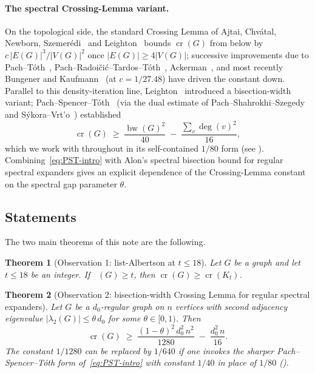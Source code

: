 \documentclass[11pt,a4paper]{article}
\newtheorem{theorem}{Theorem}
\theoremstyle{definition}
\DeclareMathOperator{\crN}{cr}
\DeclareMathOperator{\chl}{\chi_{\ell}}
\DeclareMathOperator{\bw}{bw}
\begin{document}
\paragraph{The spectral Crossing-Lemma variant.}
On the topological side, the standard Crossing Lemma of Ajtai,
Chv\'atal, Newborn, Szemer\'edi~\cite{ACNS} and
Leighton~\cite{Leighton83} bounds $\crN(G)$ from below by
$c\,|E(G)|^{3}/|V(G)|^{2}$ once $|E(G)| \ge 4|V(G)|$; successive
improvements due to Pach--T\'oth~\cite{PachToth97},
Pach--Radoi\v{c}i\'c--Tardos--T\'oth~\cite{PRTT},
Ackerman~\cite{Ackerman}, and most recently Bungener and
Kaufmann~\cite{BK24} (at $c = 1/27.48$) have driven the constant
down. Parallel to this density-iteration line, Leighton~\cite{Leighton84}
introduced a bisection-width variant; Pach--Spencer--T\'oth~\cite{PachSpencerToth}
(via the dual estimate of Pach--Shahrokhi--Szegedy~\cite{PachShahrokhiSzegedy}
and S\'ykora--Vrt'o~\cite{SykoraVrto}) established
\begin{equation}\label{eq:PST-intro}
   \crN(G) \;\ge\; \frac{\bw(G)^{2}}{40} \;-\; \frac{\sum_v \deg(v)^{2}}{16},
\end{equation}
which we work with throughout in its self-contained $1/80$ form
(see ). Combining~\eqref{eq:PST-intro} with Alon's
spectral bisection bound for regular spectral expanders gives an
explicit dependence of the Crossing-Lemma constant on the spectral
gap parameter $\theta$.

\subsection{Statements}\label{ssec:statements}

The two main theorems of this note are the following.

\begin{theorem}[Observation 1: list-Albertson at $t \le 18$]\label{thm:main-list}
Let $G$ be a graph and let $t \le 18$ be an integer. If
$\chl(G) \ge t$, then $\crN(G) \ge \crN(K_t)$.
\end{theorem}

\begin{theorem}[Observation 2: bisection-width Crossing Lemma for
                regular spectral expanders]\label{thm:main-spec}
Let $G$ be a $d_0$-regular graph on $n$ vertices with second
adjacency eigenvalue $|\lambda_2(G)| \le \theta\,d_0$ for some
$\theta \in [0, 1)$. Then
\begin{equation}\label{eq:Tone-prime}
   \crN(G) \;\ge\;
     \frac{(1 - \theta)^{2}\,d_0^{2}\,n^{2}}{1280}
     \;-\; \frac{d_0^{2}\,n}{16}.
\end{equation}
The constant $1/1280$ can be replaced by $1/640$ if one invokes the
sharper Pach--Spencer--T\'oth form of~\eqref{eq:PST-intro} with
constant $1/40$ in place of $1/80$ ().
\end{theorem}
\end{document}

